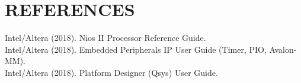 \documentclass[12pt,a4paper]{article}
\begin{document}
\newpage


\newpage
\section*{REFERENCES}

\noindent Intel/Altera (2018). Nios II Processor Reference Guide.\\
\noindent Intel/Altera (2018). Embedded Peripherals IP User Guide (Timer, PIO, Avalon-MM).\\
\noindent Intel/Altera (2018). Platform Designer (Qsys) User Guide.
\end{document}
